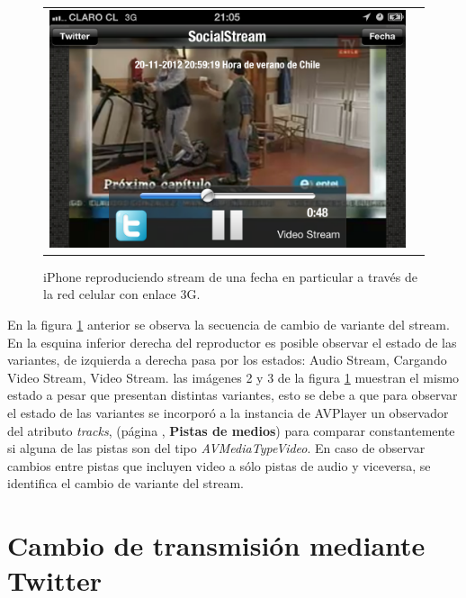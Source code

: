 \begin{figure}[H]
\begin{tabular}{cc}
	\includegraphics[scale=0.2]{imgs/cell-link-4.png} \\
	\end{tabular}
	\caption{iPhone reproduciendo stream de una fecha en particular a través de la red celular con enlace 3G.}
	\label{fig:cell-link}
\end{figure}

En la figura \ref{fig:cell-link} anterior se observa la secuencia de cambio de variante del stream. En la esquina inferior derecha del reproductor es posible observar el estado de las variantes, de izquierda a derecha pasa por los estados: Audio Stream, Cargando Video Stream, Video Stream. las imágenes 2 y 3 de la figura \ref{fig:cell-link} muestran el mismo estado a pesar que presentan distintas variantes, esto se debe a que para observar el estado de las variantes se  incorporó a la instancia de AVPlayer un observador del atributo \textit{tracks}, (página \pageref{item:kvo-tracks}, \textbf{Pistas de medios}) para comparar constantemente si alguna de las pistas son del tipo \textit{AVMediaTypeVideo}. 
En caso de observar cambios entre pistas que incluyen video a sólo pistas de audio y viceversa, se identifica el cambio de variante del stream.


\section{Cambio de transmisión mediante Twitter}

